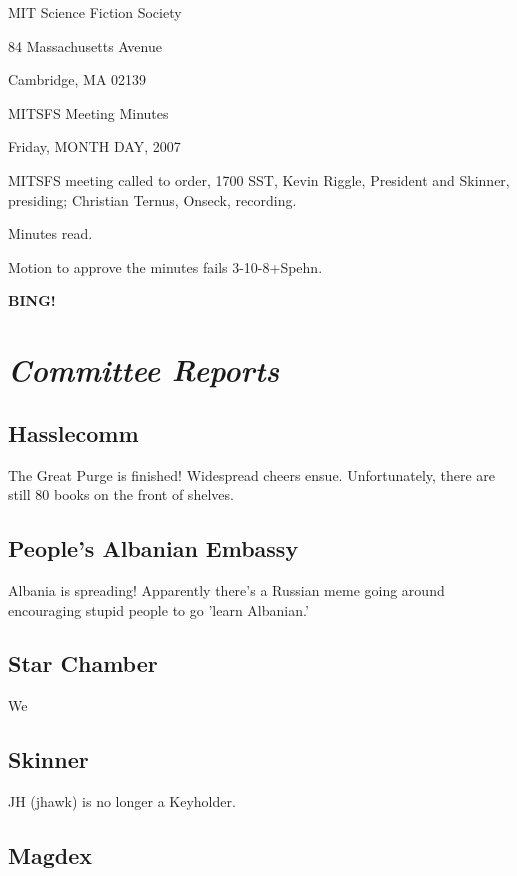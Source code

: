 \documentclass[10pt]{article}
\newcommand{\bing}{{\bf BING!} }
\newcommand{\goto}[1]{\bing \vskip 12pt \section*{{\em{#1}}}}
\begin{document}
\begin{center}

MIT Science Fiction Society

84 Massachusetts Avenue

Cambridge, MA 02139

\vspace{12pt}

MITSFS Meeting Minutes

Friday, MONTH DAY, 2007

\end{center}

\vspace{18pt}

\setlength{\parskip}{6pt}

\noindent
MITSFS meeting called to order, 1700 SST,
Kevin Riggle, President and Skinner, presiding; Christian Ternus, Onseck, recording.

Minutes read.

Motion to approve the minutes fails 3-10-8+Spehn.

\goto{Committee Reports}

\subsection*{Hasslecomm}

The Great Purge is finished!  Widespread cheers ensue.  Unfortunately, there are still 80 books on the front of shelves.


\subsection*{People's Albanian Embassy}

Albania is spreading!  Apparently there's a Russian meme going around encouraging stupid people to go 'learn Albanian.'

\subsection*{Star Chamber}

We 

\subsection*{Skinner}

JH (jhawk) is no longer a Keyholder.

\subsection*{Magdex}
\end{document}
